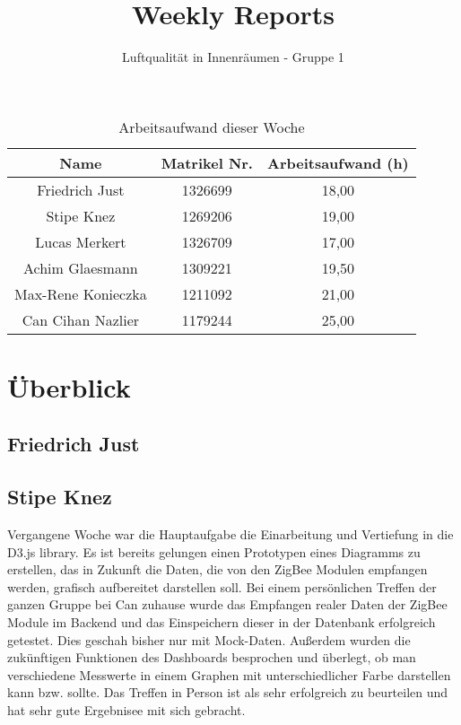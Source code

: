 \documentclass[]{article}
\title{Weekly Reports}
\author{Luftqualität in Innenräumen - Gruppe 1}
\begin{document}
\maketitle

\begin{table}[h!]
	\centering
	\begin{tabular}{|c|c|c|}
		\hline
		{\textbf{Name}}				&		{\textbf{Matrikel Nr.}} & {\textbf{Arbeitsaufwand (h)}} \\
		\hline
		Friedrich Just				&		1326699 				&		18,00\\
		\hline
		Stipe Knez					&		1269206 				&	19,00	\\
		\hline
		Lucas Merkert				&		1326709					&	17,00	\\
		\hline
		Achim Glaesmann				&		1309221					&	19,50	\\
		\hline
		Max-Rene Konieczka			&		1211092					&	21,00	\\
		\hline
		Can Cihan Nazlier			&		1179244					&	25,00	\\
		\hline
	\end{tabular}
	\caption{Arbeitsaufwand dieser Woche}
	\label{tab:worakload}
\end{table}



\section{Überblick}


\subsection{Friedrich Just}







\subsection{Stipe Knez}
Vergangene Woche war die Hauptaufgabe die Einarbeitung und Vertiefung in die D3.js library. Es ist bereits gelungen einen Prototypen eines Diagramms zu erstellen, das in Zukunft die Daten, die von den ZigBee Modulen empfangen werden, grafisch aufbereitet darstellen soll.
Bei einem persönlichen Treffen der ganzen Gruppe bei Can zuhause wurde das Empfangen realer Daten der ZigBee Module im Backend und das Einspeichern dieser in der Datenbank erfolgreich getestet. Dies geschah bisher nur mit Mock-Daten. Außerdem wurden die zukünftigen Funktionen des Dashboards besprochen und überlegt, ob man verschiedene Messwerte in einem Graphen mit unterschiedlicher Farbe darstellen kann bzw. sollte. Das Treffen in Person ist als sehr erfolgreich zu beurteilen und hat sehr gute Ergebnisee mit sich gebracht.
\end{document}
